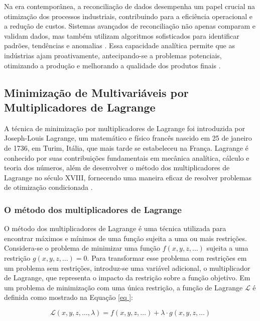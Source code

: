 Na era contemporânea, a reconciliação de dados desempenha um papel crucial na otimização dos processos industriais, contribuindo para a eficiência operacional e a redução de custos. Sistemas avançados de reconciliação não apenas comparam e validam dados, mas também utilizam algoritmos sofisticados para identificar padrões, tendências e anomalias \cite{datarecragnoli}. Essa capacidade analítica permite que as indústrias ajam proativamente, antecipando-se a problemas potenciais, otimizando a produção e melhorando a qualidade dos produtos finais \cite{datarecshakar}.

\subsection{Minimização de Multivariáveis por Multiplicadores de Lagrange}

A técnica de minimização por multiplicadores de Lagrange foi introduzida por Joseph-Louis Lagrange, um matemático e físico francês nascido em 25 de janeiro de 1736, em Turim, Itália, que mais tarde se estabeleceu na França. Lagrange é conhecido por suas contribuições fundamentais em mecânica analítica, cálculo e teoria dos números, além de desenvolver o método dos multiplicadores de Lagrange no século XVIII, fornecendo uma maneira eficaz de resolver problemas de otimização condicionada \cite{lagrange}.

\subsubsection{O método dos multiplicadores de Lagrange}

O método dos multiplicadores de Lagrange é uma técnica utilizada para encontrar máximos e mínimos de uma função sujeita a uma ou mais restrições. Considera-se o problema de minimizar uma função $f(x, y, z, \dots)$ sujeita a uma restrição $g(x, y, z, \dots) = 0$. Para transformar esse problema com restrições em um problema sem restrições, introduz-se uma variável adicional, o multiplicador de Lagrange, que representa o impacto da restrição sobre a função objetivo. Em um problema de minimização com uma única restrição, a função de Lagrange $\mathcal{L}$ é definida como mostrado na Equação \ref{eq
}:

\begin{equation} \mathcal{L}(x, y, z, \dots, \lambda) = f(x, y, z, \dots) + \lambda \cdot g(x, y, z, \dots) \label{eq
} \end{equation}

